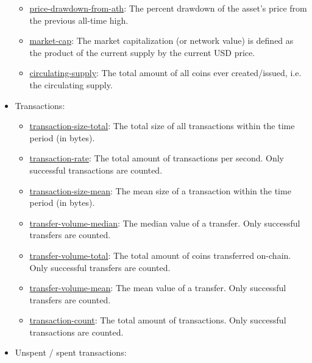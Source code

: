 \begin{itemize}
\begin{itemize}
        \item \href{https://studio.glassnode.com/metrics?a=BTC&m=market.PriceDrawdownRelative}{price-drawdown-from-ath}: The percent drawdown of the asset's price from the previous all-time high.
        \item \href{https://studio.glassnode.com/metrics?a=BTC&m=market.MarketcapUsd}{market-cap}: The market capitalization (or network value) is defined as the product of the current supply by the current USD price.
        \item \href{https://studio.glassnode.com/metrics?a=BTC&m=supply.Current}{circulating-supply}: The total amount of all coins ever created/issued, i.e. the circulating supply.
    \end{itemize}
    \item Transactions:
    \begin{itemize}
        \item \href{https://studio.glassnode.com/metrics?a=BTC&m=transactions.SizeSum}{transaction-size-total}: The total size of all transactions within the time period (in bytes).
        \item \href{https://studio.glassnode.com/metrics?a=BTC&m=transactions.Rate}{transaction-rate}: The total amount of transactions per second. Only successful transactions are counted.
        \item \href{https://studio.glassnode.com/metrics?a=BTC&m=transactions.SizeMean}{transaction-size-mean}: The mean size of a transaction within the time period (in bytes).
        \item \href{https://studio.glassnode.com/metrics?a=BTC&m=transactions.TransfersVolumeMedian}{transfer-volume-median}: The median value of a transfer. Only successful transfers are counted.
        \item \href{https://studio.glassnode.com/metrics?a=BTC&m=transactions.TransfersVolumeSum}{transfer-volume-total}: The total amount of coins transferred on-chain. Only successful transfers are counted.
        \item \href{https://studio.glassnode.com/metrics?a=BTC&m=transactions.TransfersVolumeMean}{transfer-volume-mean}: The mean value of a transfer. Only successful transfers are counted.
        \item \href{https://studio.glassnode.com/metrics?a=BTC&m=transactions.Count}{transaction-count}: The total amount of transactions. Only successful transactions are counted.
    \end{itemize}
    \item Unspent / spent transactions:

\end{itemize}

